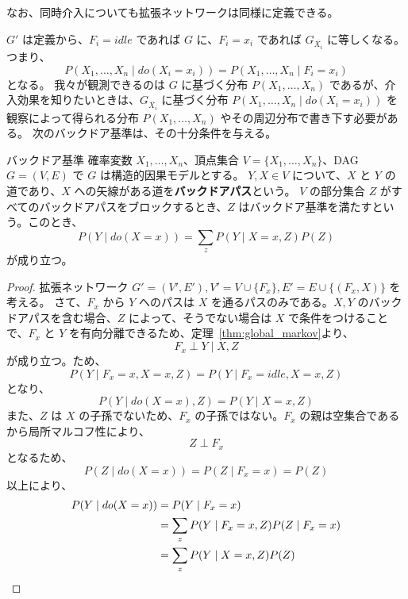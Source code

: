 \documentclass[uplatex, dvipdfmx]{jsarticle}
\begin{document}
なお、同時介入についても拡張ネットワークは同様に定義できる。

$G'$ は定義から、$F_i = idle$ であれば $G$ に、$F_i = x_i$ であれば $G_{\overline{X_i}}$ に等しくなる。つまり、
\begin{equation}
  P(X_1, \dots, X_n \mid do(X_i = x_i)) = P(X_1, \dots, X_n \mid F_i = x_i)
\end{equation}
となる。
我々が観測できるのは $G$ に基づく分布 $P(X_1, \dots, X_n)$ であるが、介入効果を知りたいときは、$G_{\overline{X_i}}$ に基づく分布 $P(X_1, \dots, X_n \mid do(X_i = x_i))$ を観察によって得られる分布 $P(X_1, \dots, X_n)$ やその周辺分布で書き下す必要がある。
次のバックドア基準は、その十分条件を与える。

\begin{prop}{バックドア基準}
  確率変数 $X_1, \dots, X_n$、頂点集合 $V = \{X_1, \dots, X_n\}$、DAG $G = (V, E)$ で $G$ は構造的因果モデルとする。
  $Y, X \in V$ について、$X$ と $Y$ の道であり、$X$ への矢線がある道を\textbf{バックドアパス}という。
  $V$ の部分集合 $Z$ がすべてのバックドアパスをブロックするとき、$Z$ はバックドア基準を満たすという。このとき、
  \begin{equation}
    P(Y \mid do(X=x)) = \sum_z P(Y \mid X=x, Z) P(Z)
  \end{equation}
  が成り立つ。
\end{prop}

\begin{proof}
  拡張ネットワーク $G' = (V', E'), V' = V \cup \{F_x\}, E' = E \cup \{(F_x, X)\}$ を考える。
  さて、$F_x$ から $Y$ へのパスは $X$ を通るパスのみである。$X, Y$ のバックドアパスを含む場合、$Z$ によって、そうでない場合は $X$ で条件をつけることで、$F_x$ と $Y$ を有向分離できるため、定理~\ref{thm:global_markov}より、
  \begin{equation}
    F_x \perp Y \mid X, Z
  \end{equation}
  が成り立つ。ため、
  \begin{equation}
    P(Y \mid F_x=x, X=x, Z) = P(Y \mid F_x=idle, X=x, Z)
  \end{equation}
  となり、
  \begin{equation}
    P(Y \mid do(X=x), Z) = P(Y \mid X=x, Z)
  \end{equation}
  また、$Z$ は $X$ の子孫でないため、$F_x$ の子孫ではない。$F_x$ の親は空集合であるから局所マルコフ性により、
  \begin{equation}
    Z \perp F_x
  \end{equation}
  となるため、
  \begin{equation}
    P(Z \mid do(X=x)) = P(Z \mid F_x=x) = P(Z)
  \end{equation}
  以上により、
  \begin{align}
    P(Y \mid do(X=x)) &= P(Y \mid F_x=x) \notag \\
    &= \sum_z P(Y \mid F_x=x, Z) P(Z \mid F_x=x) \notag \\
    &= \sum_z P(Y \mid X=x, Z) P(Z)
  \end{align}
\end{proof}
\end{document}
